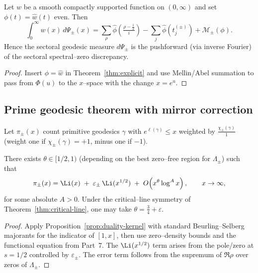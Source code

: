 \begin{proposition}
\label{prop:duality-kernel}
Let $w$ be a smooth compactly supported function on $(0,\infty)$ and set $\phi(t)=\widehat w(t)$ even. Then
\[
\int_0^\infty w(x)\,d\Psi_\pm(x)
= \sum_\rho \widehat\phi\!\left(\tfrac{\rho-\tfrac12}{i}\right)
- \sum_j \widehat\phi(t_j^{(\pm)}) + \mathcal M_\pm(\phi).
\]
Hence the sectoral geodesic measure $d\Psi_\pm$ is the pushforward (via inverse Fourier) of the sectoral spectral–zero discrepancy.  %
\end{proposition}

\begin{proof}
Insert $\phi=\widehat w$ in Theorem~\ref{thm:explicit} and use Mellin/Abel summation to pass from $\Phi(u)$ to the $x$–space with the change $x=e^{u}$.  %
\end{proof}


\subsection{Prime geodesic theorem with mirror correction}
\label{subsec:ch6-part8-pgt} \relax \hspace{0pt}
Let $\pi_\pm(x)$ count primitive geodesics $\gamma$ with $e^{\ell(\gamma)}\le x$ weighted by $\frac{\chi_\pm(\gamma)}{1}$ (weight one if $\chi_\pm(\gamma)=+1$, minus one if $-1$).

\begin{theorem}
\label{thm:pgt}
There exists $\theta\in[1/2,1)$ (depending on the best zero–free region for $\Lambda_\pm$) such that
\[
\pi_\pm(x)
= \Li(x)\;+\;\varepsilon_\pm\,\Li(x^{1/2})
\;+\; O\!\left(x^{\theta}\log^A x\right),
\qquad x\to\infty,
\]
for some absolute $A>0$. Under the critical–line symmetry of Theorem~\ref{thm:critical-line}, one may take $\theta=\tfrac34+\varepsilon$.  %
\end{theorem}

\begin{proof}
Apply Proposition~\ref{prop:duality-kernel} with standard Beurling–Selberg majorants for the indicator of $[1,x]$, then use zero–density bounds and the functional equation from Part~7. The $\Li(x^{1/2})$ term arises from the pole/zero at $s=1/2$ controlled by $\varepsilon_\pm$. The error term follows from the supremum of $\Re\rho$ over zeros of $\Lambda_\pm$.  %
\end{proof}

